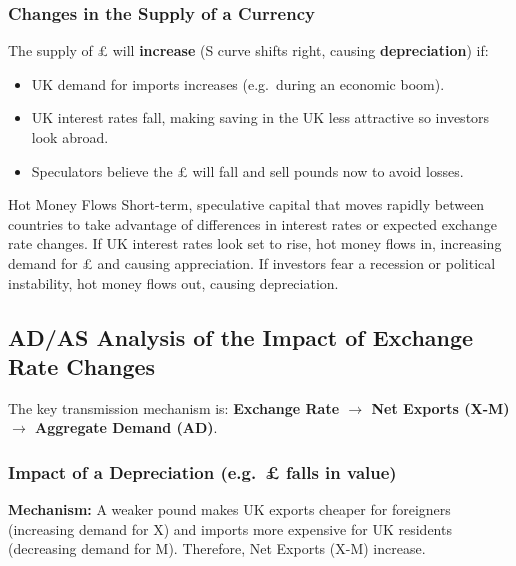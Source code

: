 \documentclass[11pt, a4paper, twoside]{book}
\begin{document}
\subsubsection{Changes in the Supply of a Currency}

The supply of £ will \textbf{increase} (S curve shifts right, causing \textbf{depreciation}) if:
\begin{itemize}
  \item UK demand for imports increases (e.g.\ during an economic boom).
  \item UK interest rates fall, making saving in the UK less attractive so investors look abroad.
  \item Speculators believe the £ will fall and sell pounds now to avoid losses.
\end{itemize}

\begin{keyterm}{Hot Money Flows}
Short-term, speculative capital that moves rapidly between countries to take advantage of differences in interest rates or expected exchange rate changes. If UK interest rates look set to rise, hot money flows in, increasing demand for £ and causing appreciation. If investors fear a recession or political instability, hot money flows out, causing depreciation.
\end{keyterm}

\subsection{AD/AS Analysis of the Impact of Exchange Rate Changes}

The key transmission mechanism is: \textbf{Exchange Rate $\rightarrow$ Net Exports (X-M) $\rightarrow$ Aggregate Demand (AD)}.

\subsubsection{Impact of a Depreciation (e.g.\ £ falls in value)}

\textbf{Mechanism:} A weaker pound makes UK exports cheaper for foreigners (increasing demand for X) and imports more expensive for UK residents (decreasing demand for M). Therefore, Net Exports (X-M) increase.
\end{document}
